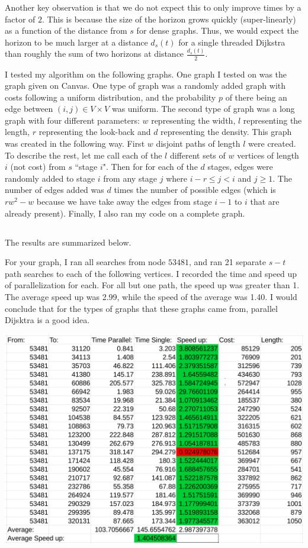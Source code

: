 \documentclass{article}
\begin{document}
Another key observation is that we do not expect this to only improve times by a factor of $2$.
This is because the size of the horizon grows quickly (super-linearly) as a function of the distance from $s$ for dense graphs.
Thus, we would expect the horizon to be much larger at a distance $d_s(t)$ for a single threaded Dijkstra
than roughly the sum of two horizons at distance $\frac{d_s(t)} 2$.

I tested my algorithm on the following graphs.
One graph I tested on was the graph given on Canvas.
One type of graph was a randomly added graph with costs following a uniform distribution, and the probability $p$ of there being an edge between $(i,j) \in V \times V$
was uniform.
The second type of graph was a long graph with four different parameters: $w$ representing the width, $l$ representing the length, $r$ representing the look-back and $d$ representing the density.
This graph was created in the following way.
First $w$ disjoint paths of length $l$ were created.
To describe the rest, let me call each of the $l$ different sets of $w$ vertices of length $i$ (not cost) from $s$ ``stage $i$".
Then for for each of the $d$ stages, edges were randomly added to stage $i$ from any stage $j$ where $i-r \le j < i$ and $j \ge 1$.
The number of edges added was $d$ times the number of possible edges (which is $rw^2 - w$ because we have take away the edges from stage $i-1$ to $i$ that are already present).
Finally, I also ran my code on a complete graph.


\subsection{}
The results are summarized below.


For your graph, I ran all searches from node $53481$, and ran 21 separate $s-t$ path searches to each of the following vertices.
I recorded the time and speed up of parallelization for each. For all but one path, the speed up was greater than 1.
The average speed up was 2.99, while the speed of the average was 1.40.
I would conclude that for the types of graphs that these graphs came from, parallel Dijsktra is a good idea.

\includegraphics[scale=0.15]{summary1.png}
\end{document}

